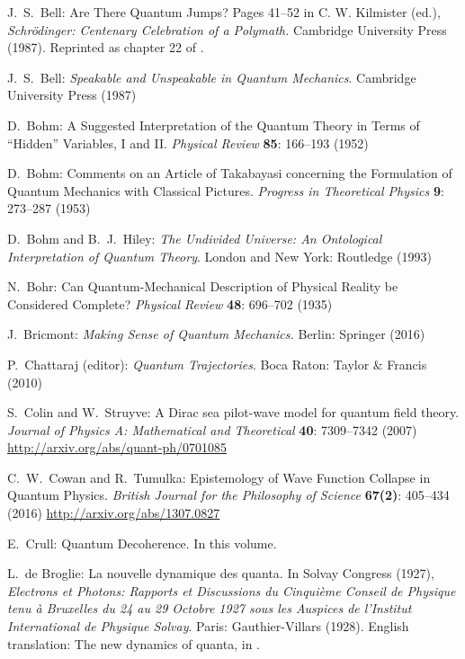 \documentclass[12pt]{article}
\begin{document}
\begin{thebibliography}{20}
 J.~S.~Bell: 
	Are There Quantum Jumps? 
	Pages 41--52 in C. W. Kilmister (ed.),
	\textit{Schr\"odinger: Centenary Celebration of a Polymath.} 
	Cambridge University Press (1987). 
	Reprinted as chapter 22 of \cite{Bell87b}. 

 J.~S.~Bell: 
	\textit{Speakable and Unspeakable in Quantum Mechanics}. 
	Cambridge University Press (1987)

 D.~Bohm: 
	A Suggested Interpretation of the Quantum Theory in Terms of ``Hidden'' Variables, I and II. 
	\textit{Physical Review} \textbf{85}: 166--193 (1952)

 D.~Bohm: 
	Comments on an Article of Takabayasi concerning the Formulation 
	of Quantum Mechanics with Classical Pictures.
	\textit{Progress in Theoretical Physics} \textbf{9}: 273--287 (1953)

 D.~Bohm and B.~J.~Hiley: 
	\textit{The Undivided Universe: An Ontological Interpretation of Quantum Theory}. 
	London and New York: Routledge (1993)

 N.~Bohr:
	Can Quantum-Mechanical Description of Physical Reality be Considered Complete?
	\textit{Physical Review} \textbf{48}: 696--702 (1935)

 J.~Bricmont:
	\textit{Making Sense of Quantum Mechanics.}
	Berlin: Springer (2016)

 P.~Chattaraj (editor):
	\textit{Quantum Trajectories}.
	Boca Raton: Taylor \& Francis (2010)

 S.~Colin and W.~Struyve:
	A Dirac sea pilot-wave model for quantum field theory.
	\textit{Journal of Physics A: Mathematical and Theoretical} \textbf{40}: 7309--7342 (2007) 
	\url{http://arxiv.org/abs/quant-ph/0701085}

 C.~W.~Cowan and R.~Tumulka:
	Epistemology of Wave Function Collapse in Quantum Physics.
	\textit{British Journal for the Philosophy of Science} 
	{\bf 67(2)}: 405--434 (2016)
	\url{http://arxiv.org/abs/1307.0827}
	
 E.~Crull: Quantum Decoherence.
	In this volume.

 L.~de Broglie:
	La nouvelle dynamique des quanta.
	In Solvay Congress (1927),
	{\em Electrons et Photons: Rapports et Discussions du Cinqui\`eme
	Conseil de Physique tenu \`a Bruxelles du 24 au 29 Octobre 1927
	sous les Auspices de l'Institut International de Physique Solvay}.
	Paris: Gauthier-Villars (1928). 
	English translation: The new dynamics of quanta, in \cite{BV09}.


\end{thebibliography}
\end{document}
